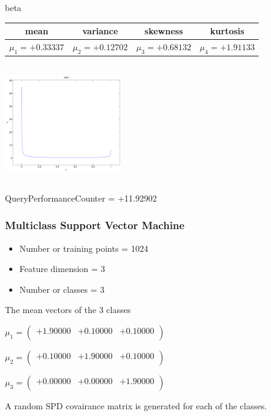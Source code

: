 \documentclass[9pt]{article}
\theoremstyle{plain}
\theoremstyle{definition}
\theoremstyle{remark}
\numberwithin{equation}{section}
\begin{document}
\newpage
beta \begin{tabular}{|c|c|c|c|}  mean & variance & skewness & kurtosis \\  \hline
$\mu_1 = +0.33337$ & $\mu_2 = +0.12702$ & $\mu_3 = +0.68132$ & $\mu_4 =+1.91133$ \\
\end{tabular}

\includegraphics[width=5cm,height=5cm]{beta.pdf}

QueryPerformanceCounter  =  +11.92902
\subsubsection{Multiclass Support Vector Machine }
\begin{itemize}
\item Number or training points = 1024
\item Feature dimension = 3
\item Number or classes = 3
\end{itemize}
{The mean vectors of the 3 classes}

$\mu_1 = \left(
\begin{array}{
ccc}
+1.90000 & +0.10000 & +0.10000 \\
\end{array}
\right)$ \newline 

$\mu_2 = \left(
\begin{array}{
ccc}
+0.10000 & +1.90000 & +0.10000 \\
\end{array}
\right)$ \newline 

$\mu_3 = \left(
\begin{array}{
ccc}
+0.00000 & +0.00000 & +1.90000 \\
\end{array}
\right)$ \newline 

A random SPD covairance matrix is generated for each of the classes.\newline
\end{document}
